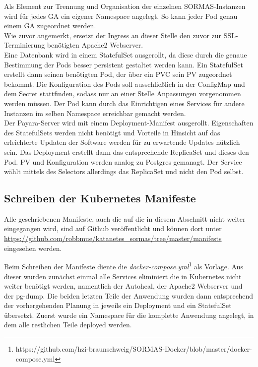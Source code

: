 Als Element zur Trennung und Organisation der einzelnen \ac{SORMAS}-Instanzen wird für jedes \ac{GA} ein eigener Namespace angelegt.
So kann jeder Pod genau einem \ac{GA} zugeordnet werden.\\
Wie zuvor angemerkt, ersetzt der Ingress an dieser Stelle den zuvor zur \ac{SSL}-Terminierung benötigten Apache2 Webserver.\\
Eine Datenbank wird in einem StatefulSet ausgerollt, da diese durch die genaue Bestimmung der Pods besser persistent gestaltet werden kann.
Ein StatefulSet erstellt dann seinen benötigten Pod, der über ein \ac{PVC} sein \ac{PV} zugeordnet bekommt. 
Die Konfiguration des Pods soll ausschließlich in der ConfigMap und dem Secret stattfinden, sodass nur an einer Stelle Anpassungen vorgenommen werden müssen.
Der Pod kann durch das Einrichtigen eines Services für andere Instanzen im selben Namespace erreichbar gemacht werden.\\
Der Payara-Server wird mit einem Deployment-Manifest ausgerollt. 
Eigenschaften des StatefulSets werden nicht benötigt und Vorteile in Hinsicht auf das erleichterte Updaten der Software werden für zu erwartende Updates nützlich sein.
Das Deployment erstellt dann das entsprechende ReplicaSet und dieses den Pod. 
\ac{PV} und Konfiguration werden analog zu Postgres gemanagt. 
Der Service wählt mittels des Selectors allerdings das ReplicaSet und nicht den Pod selbst.


\subsection{Schreiben der Kubernetes Manifeste}

Alle geschriebenen Manifeste, auch die auf die in diesem Abschnitt nicht weiter eingegangen wird, sind auf Github veröffentlicht und können dort unter \url{https://github.com/robbmue/katanetes_sormas/tree/master/manifests} eingesehen werden. 

Beim Schreiben der Manifeste diente die \textit{docker-compose.yml}\footnote{https://github.com/hzi-braunschweig/SORMAS-Docker/blob/master/docker-compose.yml} als Vorlage.
Aus dieser wurden zunächst einmal alle Services eliminiert die in Kubernetes nicht weiter benötigt werden, namentlich der Autoheal, der Apache2 Webserver und der pg-dump.
Die beiden letzten Teile der Anwendung wurden dann entsprechend der vorhergehenden Planung in jeweils ein Deployment und ein StatefulSet übersetzt.
Zuerst wurde ein Namespace für die komplette Anwendung angelegt, in dem alle restlichen Teile deployed werden.

